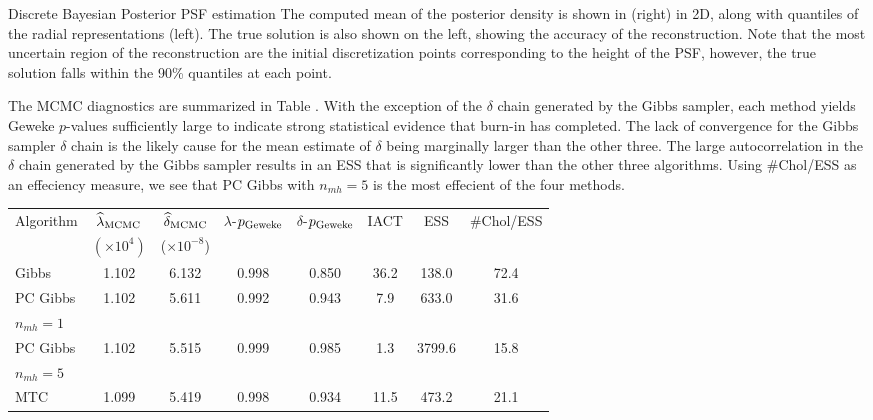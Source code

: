 \begin{chapter}{Discrete Bayesian Posterior PSF estimation}
The computed mean of the posterior density is shown in  (right) in 2D, along with quantiles of the radial representations (left). 
The true solution is also shown on the left, showing the accuracy of the reconstruction.  
Note that the most uncertain region of the reconstruction are the initial discretization points corresponding to the height of the PSF, however, the true solution falls within the 90\% quantiles at each point.

The MCMC diagnostics are summarized in Table . 
With the exception of the $\delta$ chain generated by the Gibbs sampler, each method yields Geweke $p$-values sufficiently large to indicate strong statistical evidence that burn-in has completed. 
The lack of convergence for the Gibbs sampler $\delta$ chain is the likely cause for the mean estimate of $\delta$ being marginally larger than the other three. 
The large autocorrelation in the $\delta$ chain generated by the Gibbs sampler results in an ESS that is significantly lower than the other three algorithms. 
Using \#Chol/ESS as an effeciency measure, we see that PC Gibbs with $n_{mh}=5$ is the most effecient of the four methods.
\begin{table}[h]
\begin{center}
  \begin{tabular}{l|ccccccc}
    \hline
    Algorithm       & $\hat{\lambda}_{\rm MCMC}$& $\hat{\delta}_{\rm MCMC}$  & $\lambda$-$p_{\rm Geweke}$&$\delta$-$p_{\rm Geweke}$& IACT & ESS    & \#Chol/ESS \\
     & $(\times 10^{4})$ & ($\times 10^{-8}$) & & \\
    \hline
	      Gibbs &                 1.102 &                 6.132 &                    0.998 &                    0.850& 36.2 &  138.0 &      72.4 \\
PC Gibbs &                 1.102 &                 5.611 &                    0.992 &                    0.943&  7.9 &  633.0 &      31.6 \\
\hspace{.2in} $n_{mh}= 1$ & & & & & & & \\
PC Gibbs &                 1.102 &                 5.515&                    0.999 &                    0.985&  1.3 & 3799.6 &      15.8 \\
\hspace{.2in} $n_{mh}= 5$ & & & & & & & \\
		MTC &                 1.099 &                 5.419 &                    0.998 &                    0.934& 11.5 &  473.2 &      21.1 \\

\end{tabular}
\end{center}
\end{table}
\end{chapter}
